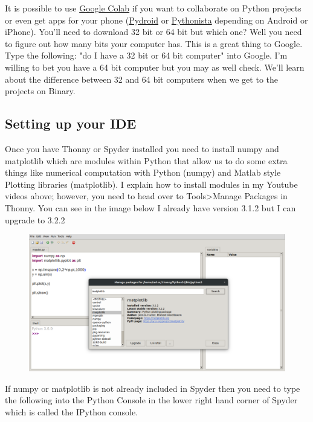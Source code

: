 It is possible to use
\href{https://colab.research.google.com/drive/1-VzSDojevQZ6A0oJNol9YXV6SRp3FKeP}{Google
  Colab} if you want to collaborate on Python projects or even get apps for your phone (\href{https://play.google.com/store/apps/details?id=ru.iiec.pydroid3&hl=en_US&gl=US}{Pydroid} or \href{https://apps.apple.com/us/app/pythonista-3/id1085978097}{Pythonista}
depending on Android or iPhone). You'll need to download 32 bit or 64
bit but which one? Well you need to figure out how many bits your
computer has. This is a great thing to Google. Type the following: "do
I have a 32 bit or 64 bit computer" into Google. I’m willing to bet
you have a 64 bit computer but you may as well check. We’ll learn
about the difference between 32 and 64 bit computers when we get to
the projects on Binary.

\subsection{Setting up your IDE}

Once you have Thonny or Spyder installed you need to install numpy and
matplotlib which are modules within Python that allow us to do some
extra things like numerical computation with Python (numpy) and Matlab
style Plotting libraries (matplotlib). I explain how to install
modules in my Youtube videos above; however, you need to head over to
Tools>Manage Packages in Thonny. You can see in the image below I
already have version 3.1.2 but I can upgrade to 3.2.2

\begin{figure}[H]
  \begin{center}
    \includegraphics[width=\textwidth]{Figures/IDE_upgrades.png}
  \end{center}
\end{figure}

If numpy or matplotlib is not already included in Spyder then you need
to type the following into the Python Console in the lower right hand
corner of Spyder which is called the IPython console. 


